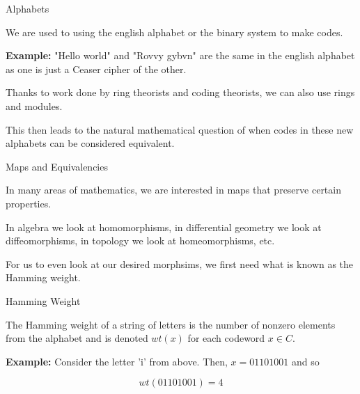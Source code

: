 \documentclass{beamer}
\begin{document}
\begin{frame}{Alphabets}

    We are used to using the english alphabet or the binary system to make codes.
    
    \medskip

    \textbf{Example:} "Hello world" and "Rovvy gybvn" are the same in the english alphabet as one is
    just a Ceaser cipher of the other.

    \bigskip

    \pause

    Thanks to work done by ring theorists and coding theorists, we can also use rings and modules.

    \bigskip

    \pause

    This then leads to the natural mathematical question of when codes in these new alphabets can be
    considered equivalent.
    
\end{frame}

\begin{frame}{Maps and Equivalencies}
    
    In many areas of mathematics, we are interested in maps that preserve certain properties.

    \medskip

    In algebra we look at homomorphisms, in differential geometry we look at diffeomorphisms, in
    topology we look at homeomorphisms, etc.

    \bigskip

    \pause

    For us to even look at our desired morphsims, we first need what is known as the Hamming weight.

   

\end{frame}

\begin{frame}{Hamming Weight}
    
    The Hamming weight of a string of letters is the number of nonzero elements from the alphabet and is
    denoted $wt(x)$ for each codeword $x\in C$.

    \medskip

    \pause

    \textbf{Example:} Consider the letter 'i' from above. Then, $x=01101001$ and so

    $$wt(01101001)=4$$

\end{frame}
\end{document}
